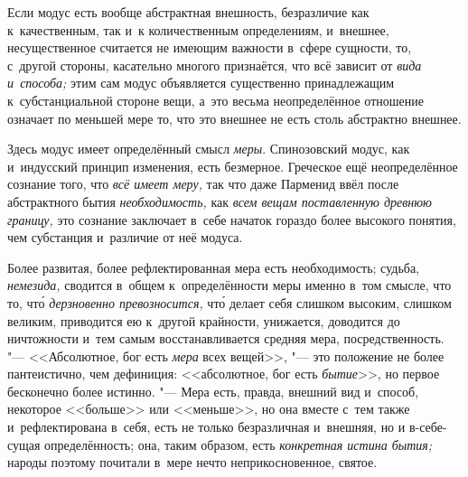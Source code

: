 Если модус есть вообще абстрактная внешность, безразличие как к~качественным,
так и~к количественным определениям, и~внешнее, несущественное считается не
имеющим важности в~сфере сущности, то, с~другой стороны, касательно многого
признаётся, что всё зависит от {\em вида и~способа;} этим сам модус объявляется
существенно принадлежащим к~субстанциальной стороне вещи, а~это весьма
неопределённое отношение означает по меньшей мере то, что это внешнее не есть
столь абстрактно внешнее.

Здесь модус имеет определённый смысл {\em меры}. Спинозовский модус,
как и~индусский принцип изменения, есть безмерное. Греческое ещё
неопределённое сознание того, что {\em всё имеет меру,} так что даже
Парменид ввёл после абстрактного бытия {\em необходимость,} как
{\em всем вещам поставленную древнюю границу,} это сознание
заключает в~себе начаток гораздо более высокого понятия, чем
субстанция и~различие от неё модуса.

Более развитая, более рефлектированная мера есть необходимость; судьба,
{\em немезида,} сводится в~общем к~определённости меры именно в~том смысле,
что то, чт\'{о} {\em дерзновенно превозносится,} чт\'{о} делает себя слишком
высоким, слишком великим, приводится ею к~другой крайности, унижается,
доводится до ничтожности и~тем самым восстанавливается средняя мера,
посредственность. "--- <<Абсолютное, бог есть {\em мера} всех вещей>>, "--- это
положение не более пантеистично, чем дефиниция: <<абсолютное, бог есть
{\em бытие}>>, но первое бесконечно более истинно. "--- Мера есть, правда,
внешний вид и~способ, некоторое <<больше>> или <<меньше>>, но она вместе с~тем
также и~рефлектирована в~себя, есть не только безразличная и~внешняя, но и
в-себе-сущая определённость; она, таким образом, есть {\em конкретная истина
бытия;} народы поэтому почитали в~мере нечто неприкосновенное, святое.

